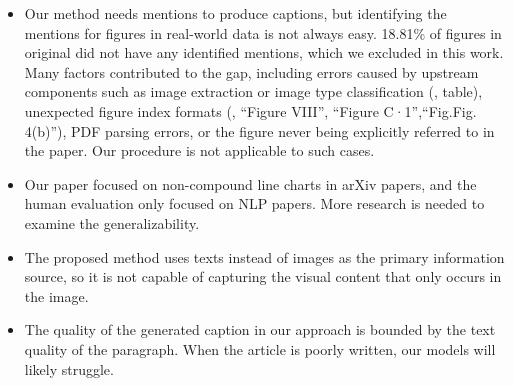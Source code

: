 \begin{itemize}
    \item Our method needs mentions to produce captions, but identifying the mentions for figures in real-world data is not always easy. 18.81\% of figures in original \oldDataset did not have any identified mentions, which we excluded in this work.
Many factors contributed to the gap, including
errors caused by upstream components such as image extraction or image type classification (\eg, table),
unexpected figure index formats (\eg, ``Figure VIII'', ``Figure C·1'',``Fig.Fig. 4(b)''),
PDF parsing errors, or 
the figure never being explicitly referred to in the paper. Our procedure is not applicable to such cases.

\item
Our paper focused on non-compound line charts in arXiv papers, and the human evaluation only focused on NLP papers.
More research is needed to examine the generalizability.

\item 
The proposed method uses texts instead of images as the primary information source, so it is not capable of capturing the visual content that only occurs in the image.

\item 
The quality of the generated caption in our approach is bounded by the text quality of the paragraph.
When the article is poorly written, our models will likely struggle.

\end{itemize}